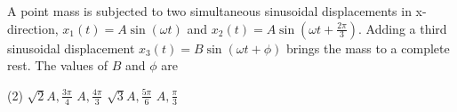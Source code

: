 
\item A point mass is subjected to two simultaneous sinusoidal displacements in x-direction, \(x_1(t) = A \sin(\omega t)\) and \(x_2(t) = A \sin\left(\omega t + \frac{2\pi}{3}\right)\). Adding a third sinusoidal displacement \(x_3(t) = B \sin(\omega t + \phi)\) brings the mass to a complete rest. The values of \(B\) and \(\phi\) are
    \begin{tasks}(2)
        \task \(\sqrt{2} A, \frac{3\pi}{4}\)
        \task \(A, \frac{4\pi}{3}\)
        \task \(\sqrt{3} A, \frac{5\pi}{6}\)
        \task \(A, \frac{\pi}{3}\)
    \end{tasks}
